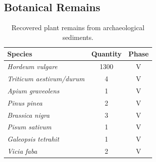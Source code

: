\documentclass[preprint, 3p, authoryear]{elsarticle} %
\begin{document}
\hypertarget{botanical-remains}{%
\subsection{Botanical Remains}\label{botanical-remains}}

\begin{table}[!h]

\caption{\label{tab:table2}Recovered plant remains from archaeological sediments.}
\centering
\fontsize{7.5}{9.5}\selectfont
\begin{tabular}[t]{>{}lcc}
\toprule
Species & Quantity & Phase\\
\midrule
\em{Hordeum vulgare} & 1300 & V\\
\em{Triticum aestivum/durum} & 4 & V\\
\em{Apium graveolens} & 1 & V\\
\em{Pinus pinea} & 2 & V\\
\em{Brassica nigra} & 3 & V\\
\em{Pisum sativum} & 1 & V\\
\em{Galeopsis tetrahit} & 1 & V\\
\em{Vicia faba} & 2 & V\\
\bottomrule
\end{tabular}
\end{table}
\end{document}

